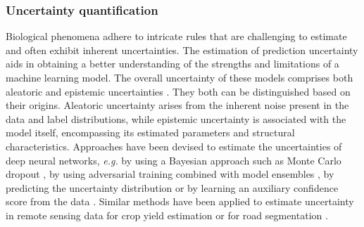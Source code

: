 \documentclass{CUP-JNL-DTM}%
\theoremstyle{definition}
\numberwithin{equation}{section}
\begin{document}
\subsubsection{Uncertainty quantification}
\label{sec:ml_uncertainty}
Biological phenomena adhere to intricate rules that are challenging to estimate and often exhibit inherent uncertainties. 
The estimation of prediction uncertainty aids in obtaining a better understanding of the strengths and limitations of a machine learning model.
%
%
The overall uncertainty of these models comprises both aleatoric and epistemic uncertainties \cite{gal_uncertainty_2016}.
They both can be distinguished based on their origins. 
Aleatoric uncertainty arises from the inherent noise present in the data and label distributions, while epistemic uncertainty is associated with the model itself, encompassing its estimated parameters and structural characteristics. 
%
Approaches have been devised to estimate the uncertainties of deep neural networks, \textit{e.g.} by using a Bayesian approach such as Monte Carlo dropout \cite{gal_dropout_2016}, by using adversarial training combined with model ensembles \cite{lakshminarayanan_simple_2017}, by predicting the uncertainty distribution \cite{malinin_predictive_2018} or by learning an auxiliary confidence score from the data \cite{corbiere_addressing_2019, corbiere_robust_2022}.
%
Similar methods have been applied to estimate uncertainty in remote sensing data for crop yield estimation \cite{ma_corn_2021} or for road segmentation \cite{haas_uncertainty_2021}.
\end{document}
